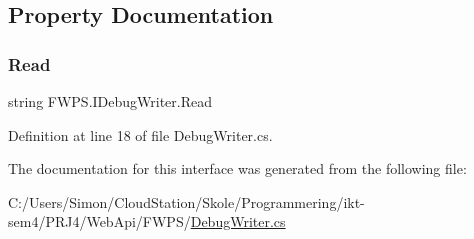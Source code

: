 \subsection{Property Documentation}
\mbox{\label{interface_f_w_p_s_1_1_i_debug_writer_a8dfed01e27e449d190b9a1e1e99cbdf3}} 
\subsubsection{\texorpdfstring{Read}{Read}}
{\footnotesize\ttfamily string F\+W\+P\+S.\+I\+Debug\+Writer.\+Read\hspace{0.3cm}{\ttfamily [get]}}



Definition at line 18 of file Debug\+Writer.\+cs.



The documentation for this interface was generated from the following file\+:\begin{DoxyCompactItemize}
\item 
C\+:/\+Users/\+Simon/\+Cloud\+Station/\+Skole/\+Programmering/ikt-\/sem4/\+P\+R\+J4/\+Web\+Api/\+F\+W\+P\+S/\mbox{\hyperlink{_debug_writer_8cs}{Debug\+Writer.\+cs}}\end{DoxyCompactItemize}
